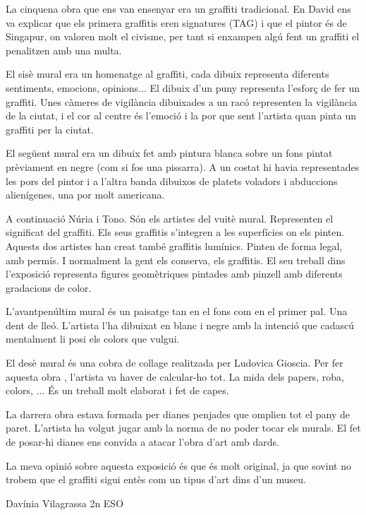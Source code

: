 \begin{news}
La cinquena obra que ens van ensenyar era un graffiti tradicional. En David ens va explicar que els primera graffitis eren signatures (TAG) i que el pintor és de Singapur, on valoren molt el civisme, per tant si enxampen algú fent un graffiti el penalitzen amb una multa.

El sisè mural era un homenatge al graffiti, cada dibuix representa diferents sentiments, emocions, opinions...
El dibuix d'un puny representa l'esforç de fer un graffiti. Unes càmeres de vigilància dibuixades a un racó representen la vigilància de la ciutat, i el cor al centre és l'emoció i la por que sent l'artista quan pinta un graffiti per la ciutat.

El següent mural era un dibuix fet amb pintura blanca sobre un fons pintat prèviament en negre (com si fos una pissarra). A un costat hi havia representades les pors del pintor i a l'altra banda dibuixos de platets voladors i abduccions alienígenes, una por molt americana.

A continuació Núria i Tono. Són els artistes del vuitè mural.
Representen el significat del graffiti.
Els seus graffitis s'integren a les superfícies on els pinten. Aquests dos artistes han creat també graffitis lumínics. Pinten de forma legal, amb permís. I normalment la gent els conserva, els graffitis. El seu treball dins l'exposició representa figures geomètriques pintades amb pinzell amb diferents gradacions de color.

L'avantpenúltim mural és un paisatge tan en el fons com en el primer pal. Una dent de lleó. L'artista l'ha dibuixat en blanc i negre amb la intenció  que cadascú mentalment li posi els colors que vulgui.

El desè mural és una cobra de collage realitzada per Ludovica Gioscia. Per fer aquesta obra , l'artista va haver de calcular-ho tot. La mida dels papers, roba, colors, ...
És un treball molt elaborat i fet de capes.

La darrera obra estava formada per dianes penjades que omplien tot el pany de paret.
L'artista ha volgut jugar amb la norma de no poder tocar els murals. El fet de posar-hi dianes ens convida a atacar l'obra d'art amb dards.

La meva opinió sobre aquesta exposició és que és molt original, ja que sovint no trobem que el graffiti sigui entès com un tipus d'art dins d'un museu.

							Davínia Vilagrassa 2n ESO


\end{news}
